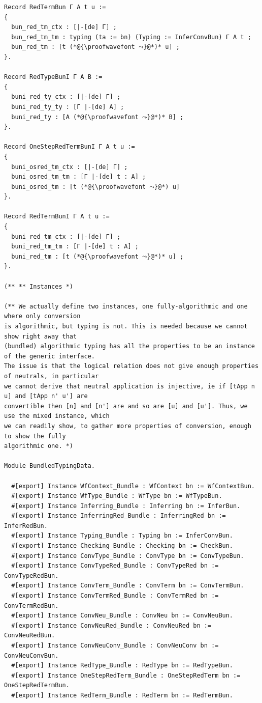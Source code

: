 \documentclass[10pt,a4paper]{amsart}
\begin{document}
\begin{lstlisting}
Record RedTermBun Γ A t u :=
{
  bun_red_tm_ctx : [|-[de] Γ] ;
  bun_red_tm_tm : typing (ta := bn) (Typing := InferConvBun) Γ A t ;
  bun_red_tm : [t (*@{\proofwavefont ⤳}@*)* u] ;
}.

Record RedTypeBunI Γ A B :=
{
  buni_red_ty_ctx : [|-[de] Γ] ;
  buni_red_ty_ty : [Γ |-[de] A] ;
  buni_red_ty : [A (*@{\proofwavefont ⤳}@*)* B] ;
}.

Record OneStepRedTermBunI Γ A t u :=
{
  buni_osred_tm_ctx : [|-[de] Γ] ;
  buni_osred_tm_tm : [Γ |-[de] t : A] ;
  buni_osred_tm : [t (*@{\proofwavefont ⤳}@*) u]
}.

Record RedTermBunI Γ A t u :=
{
  buni_red_tm_ctx : [|-[de] Γ] ;
  buni_red_tm_tm : [Γ |-[de] t : A] ;
  buni_red_tm : [t (*@{\proofwavefont ⤳}@*)* u] ;
}.

(** ** Instances *)

(** We actually define two instances, one fully-algorithmic and one where only conversion
is algorithmic, but typing is not. This is needed because we cannot show right away that
(bundled) algorithmic typing has all the properties to be an instance of the generic interface.
The issue is that the logical relation does not give enough properties of neutrals, in particular
we cannot derive that neutral application is injective, ie if [tApp n u] and [tApp n' u'] are
convertible then [n] and [n'] are and so are [u] and [u']. Thus, we use the mixed instance, which
we can readily show, to gather more properties of conversion, enough to show the fully 
algorithmic one. *)

Module BundledTypingData.

  #[export] Instance WfContext_Bundle : WfContext bn := WfContextBun.
  #[export] Instance WfType_Bundle : WfType bn := WfTypeBun.
  #[export] Instance Inferring_Bundle : Inferring bn := InferBun. 
  #[export] Instance InferringRed_Bundle : InferringRed bn := InferRedBun.
  #[export] Instance Typing_Bundle : Typing bn := InferConvBun.
  #[export] Instance Checking_Bundle : Checking bn := CheckBun.
  #[export] Instance ConvType_Bundle : ConvType bn := ConvTypeBun.
  #[export] Instance ConvTypeRed_Bundle : ConvTypeRed bn :=  ConvTypeRedBun.
  #[export] Instance ConvTerm_Bundle : ConvTerm bn := ConvTermBun.
  #[export] Instance ConvTermRed_Bundle : ConvTermRed bn := ConvTermRedBun.
  #[export] Instance ConvNeu_Bundle : ConvNeu bn := ConvNeuBun.
  #[export] Instance ConvNeuRed_Bundle : ConvNeuRed bn := ConvNeuRedBun.
  #[export] Instance ConvNeuConv_Bundle : ConvNeuConv bn := ConvNeuConvBun.
  #[export] Instance RedType_Bundle : RedType bn := RedTypeBun.
  #[export] Instance OneStepRedTerm_Bundle : OneStepRedTerm bn := OneStepRedTermBun.
  #[export] Instance RedTerm_Bundle : RedTerm bn := RedTermBun.


\end{lstlisting}
\end{document}
